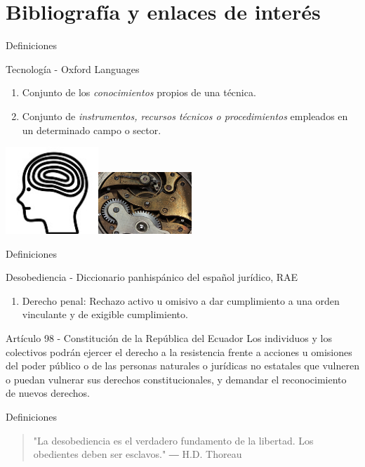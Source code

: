 \documentclass[spanish]{beamer}
\begin{document}
\section{Bibliografía y enlaces de interés}


\begin{frame}{Definiciones}
    \begin{block}{Tecnología - Oxford Languages}
        \begin{enumerate}
            \item Conjunto de los \emph{conocimientos} propios de una técnica.
            \item Conjunto de \emph{instrumentos, recursos técnicos o procedimientos} empleados en un determinado campo o sector.
        \end{enumerate}                             
    \end{block}
    \centering
    \includegraphics[width=3.5cm]{img/mind.jpg}\includegraphics[width=3.5cm]{img/clockwork.jpg}
\end{frame}
\begin{frame}{Definiciones}
    \begin{block}{Desobediencia - Diccionario panhispánico del español jurídico, RAE}
        \begin{enumerate}
            \item Derecho penal: Rechazo activo u omisivo a dar cumplimiento a una orden vinculante y de exigible cumplimiento.
        \end{enumerate}
    \end{block}
    \begin{block}{Artículo 98 - Constitución de la República del Ecuador}
        Los individuos y los colectivos podrán ejercer el derecho a la resistencia frente a acciones u omisiones del poder público o de las personas naturales o jurídicas no estatales que vulneren o puedan vulnerar sus derechos constitucionales, y demandar el reconocimiento de nuevos derechos.
    \end{block}
\end{frame}
\begin{frame}{Definiciones}
    \begin{quote}
        "La desobediencia es el verdadero fundamento de la libertad. Los obedientes deben ser esclavos." ― H.D. Thoreau
    \end{quote}
\end{frame}
\end{document}
